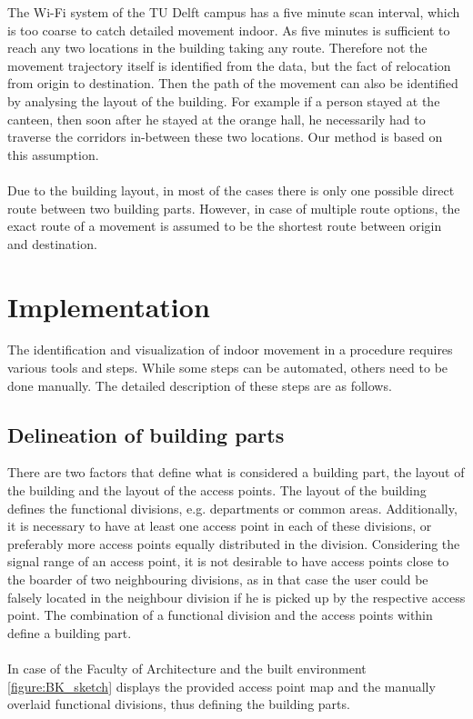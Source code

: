 The Wi-Fi system of the TU Delft campus has a five minute scan interval, which is too coarse to catch detailed movement indoor. As five minutes is
sufficient to reach any two locations in the building taking any route. Therefore not the movement trajectory itself is identified from the data, but
the fact of relocation from origin to destination. Then the path of the movement can also be identified by analysing the layout of the building. For example if a
person stayed at the canteen, then soon after he stayed at the orange hall, he necessarily had to traverse the corridors in-between these two locations. Our method is based on this assumption.
\\\\
Due to the building layout, in most of the cases there is only one possible direct route between two building parts. However, in case of multiple route
options, the exact route of a movement is assumed to be the shortest route between origin and destination.

\section{Implementation}
The identification and visualization of indoor movement in a procedure requires various tools and steps. While some steps can be automated, others need to be done manually. The detailed description of these steps are as follows.

\subsection{Delineation of building parts}
There are two factors that define what is considered a building part, the layout of the building and the layout of the access points. The layout of the
building defines the functional divisions, e.g. departments or common areas. Additionally, it is necessary to have at least one access point in each of these
divisions, or preferably more access points equally distributed in the division. Considering the signal range of an access point, it is not desirable to have
access points close to the boarder of two neighbouring divisions, as in that case the user could be falsely located in the neighbour division if he is picked
up by the respective access point. The combination of a functional division and the access points within define a building part.\\\\

In case of the Faculty of Architecture and the built environment \autoref{figure:BK_sketch} displays the provided access point map and the manually overlaid functional divisions, thus defining the building parts.

